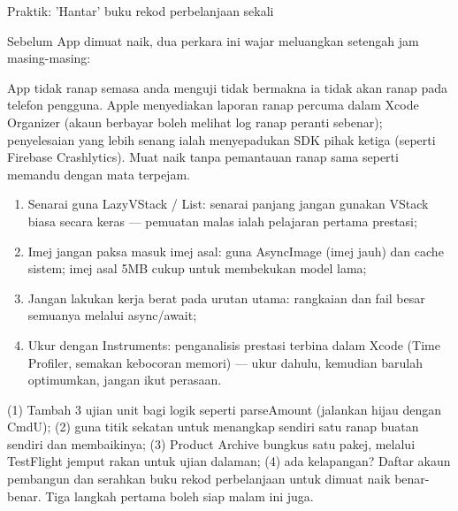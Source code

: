 \begin{tcbpractice}{Praktik: 'Hantar' buku rekod perbelanjaan sekali}

Sebelum App dimuat naik, dua perkara ini wajar meluangkan setengah jam masing-masing:


App tidak ranap semasa anda menguji tidak bermakna ia tidak akan ranap pada telefon pengguna. Apple menyediakan laporan ranap percuma dalam Xcode Organizer (akaun berbayar boleh melihat log ranap peranti sebenar); penyelesaian yang lebih senang ialah menyepadukan SDK pihak ketiga (seperti Firebase Crashlytics). Muat naik tanpa pemantauan ranap sama seperti memandu dengan mata terpejam.


\begin{enumerate}
  \item Senarai guna LazyVStack / List: senarai panjang jangan gunakan VStack biasa secara keras — pemuatan malas ialah pelajaran pertama prestasi;
  \item Imej jangan paksa masuk imej asal: guna AsyncImage (imej jauh) dan cache sistem; imej asal 5MB cukup untuk membekukan model lama;
  \item Jangan lakukan kerja berat pada urutan utama: rangkaian dan fail besar semuanya melalui async/await;
  \item Ukur dengan Instruments: penganalisis prestasi terbina dalam Xcode (Time Profiler, semakan kebocoran memori) — ukur dahulu, kemudian barulah optimumkan, jangan ikut perasaan.
\end{enumerate}

(1) Tambah 3 ujian unit bagi logik seperti parseAmount (jalankan hijau dengan CmdU); (2) guna titik sekatan untuk menangkap sendiri satu ranap buatan sendiri dan membaikinya; (3) Product Archive bungkus satu pakej, melalui TestFlight jemput rakan untuk ujian dalaman; (4) ada kelapangan? Daftar akaun pembangun dan serahkan buku rekod perbelanjaan untuk dimuat naik benar-benar. Tiga langkah pertama boleh siap malam ini juga.

\end{tcbpractice}

